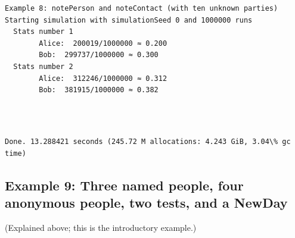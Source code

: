 \documentclass[11pt]{article}
\begin{document}
    \begin{Verbatim}[commandchars=\\\{\}]
Example 8: notePerson and noteContact (with ten unknown parties)
Starting simulation with simulationSeed 0 and 1000000 runs
  Stats number 1
        Alice:  200019/1000000 ≈ 0.200
        Bob:  299737/1000000 ≈ 0.300
  Stats number 2
        Alice:  312246/1000000 ≈ 0.312
        Bob:  381915/1000000 ≈ 0.382
    \end{Verbatim}

    \begin{center}
    \end{center}
    { \hspace*{\fill} \\}
    
    \begin{Verbatim}[commandchars=\\\{\}]

Done. 13.288421 seconds (245.72 M allocations: 4.243 GiB, 3.04\% gc time)
    \end{Verbatim}
\newpage
    \hypertarget{example-9-three-named-people-four-anonymous-people-two-tests-and-a-newday}{%
\subsection{Example 9: Three named people, four anonymous people, two
tests, and a
NewDay}\label{example-9-three-named-people-four-anonymous-people-two-tests-and-a-newday}}

(Explained above; this is the introductory example.)
\end{document}
